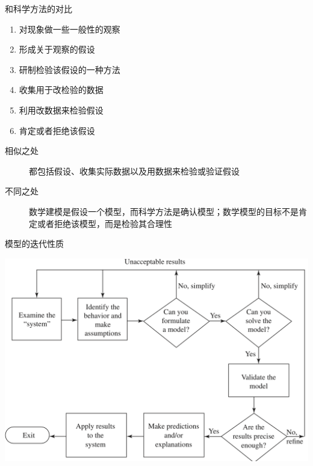 \documentclass[UTF8, mathserif]{ctexbeamer}
\begin{document}
\begin{frame}{和科学方法的对比}

  \begin{enumerate}
  \item 对现象做一些一般性的观察
  \item 形成关于观察的假设
  \item 研制检验该假设的一种方法
  \item 收集用于改检验的数据
  \item 利用改数据来检验假设
  \item 肯定或者拒绝该假设
  \end{enumerate}

  \begin{description}
  \item[相似之处] 都包括假设、收集实际数据以及用数据来检验或验证假设
  \item[不同之处] 数学建模是假设一个模型，而科学方法是确认模型；数学模型的目标不是肯定或者拒绝该模型，而是检验其合理性
  \end{description}
  
\end{frame}

\begin{frame}{模型的迭代性质}

  \begin{center}
    \includegraphics[width=.8\textwidth{}]{modeliterate.png}
  \end{center}
  
\end{frame}
\end{document}
